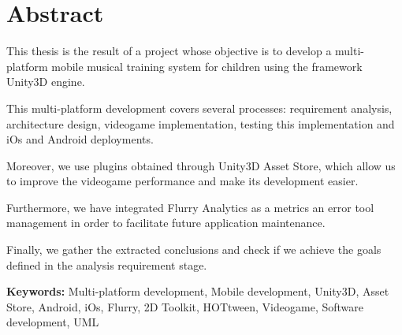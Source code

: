 \cleardoublepage
{}
\chapter*{Abstract}

This thesis is the result of a project whose objective is to develop a multi-platform mobile musical training system for children using the framework Unity3D engine.

This multi-platform development covers several processes: requirement analysis, architecture design, videogame implementation, testing this implementation and iOs and Android deployments.

Moreover, we use plugins obtained through Unity3D Asset Store, which allow us to improve the videogame performance and make its development easier.

Furthermore, we have integrated Flurry Analytics as a metrics an error tool management in order to facilitate future application maintenance.

Finally, we gather the extracted conclusions and check if we achieve the goals defined in the analysis requirement stage.


\vfill
\textbf{Keywords:} Multi-platform development, Mobile development, Unity3D, Asset Store, Android, iOs, Flurry, 2D Toolkit, HOTtween, Videogame, Software development, UML